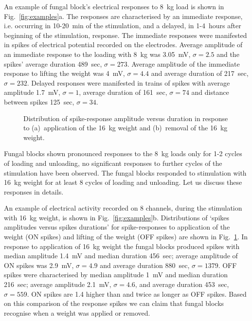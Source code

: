 \documentclass[]{elsarticle}
\begin{document}
An example of fungal block's electrical responses to 8~kg load is shown in Fig.~\ref{fig:examples}a. The responses are characterised by an immediate response, i.e. occurring in 10-20~min of the stimulation, and a delayed, in 1-4~hours after beginning of the stimulation, response. The immediate responses were manifested in spikes of electrical potential recorded on the electrodes. Average amplitude of an immediate response to the loading with 8~kg was 3.05~mV, $\sigma=2.5$ and the spikes' average duration 489~sec, $\sigma=273$. Average amplitude of the immediate response to lifting the weight was 4~mV, $\sigma=4.4$ and average duration of 217~sec, $\sigma=232$. Delayed responses were manifested in trains of spikes with average amplitude 1.7~mV, $\sigma=1$, average duration of 161~sec, $\sigma=74$ and distance between spikes 125~sec, $\sigma=34$.

\begin{figure}[!tbp]
    \centering
    \caption{Distribution of spike-response amplitude versus duration in response to (a)~application of the 16~kg weight and (b)~removal of the 16~kg weight.}
    \label{fig:distributions}
\end{figure}

Fungal blocks shown pronounced responses to the 8~kg loads only for 1-2 cycles of loading and unloading, no significant responses to further cycles of the stimulation have been observed.  The fungal blocks responded to stimulation with 16~kg weight for at least 8 cycles of loading and unloading. Let us discuss these responses in details. 

An example of electrical activity recorded on 8 channels, during the stimulation with 16~kg weight, is shown in Fig.~\ref{fig:examples}b. Distributions of `spikes amplitudes versus spikes durations' for spike-responses to application of the weight (ON spikes) and lifting of the weight (OFF spikes) are shown in Fig.~\ref{fig:distributions}. In response to application of 16~kg weight the fungal blocks produced spikes with median amplitude 1.4~mV and median duration 456~sec; average amplitude of ON spikes was 2.9~mV, $\sigma=4.9$ and average duration 880~sec, $\sigma=1379$. OFF spikes were characterised by median amplitude 1~mV and median duration 216~sec; average amplitude 2.1~mV, $\sigma=4.6$, and average duration 453~sec, $\sigma=559$. ON spikes are 1.4 higher than and twice as longer as OFF spikes. Based on this comparison of the response spikes we can claim that fungal blocks recognise when a weight was applied or removed. 
\end{document}
